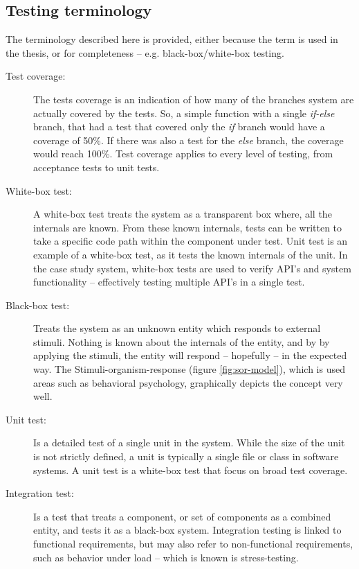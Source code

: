 \subsection{Testing terminology}
The terminology described here is provided, either because the term is used in the thesis, or for completeness -- e.g. black-box/white-box testing.
\begin{description}

  \item[Test coverage:] The tests coverage is an indication of how many of the branches system are actually covered by the tests. So, a simple function with a single \emph{if-else} branch, that had a test that covered only the \emph{if} branch would have a coverage of 50\%. If there was also a test for the \emph{else} branch, the coverage would reach 100\%. Test coverage applies to every level of testing, from acceptance tests to unit tests.

  \item[White-box test:] A white-box test treats the system as a transparent box where, all the internals are known. From these known internals, tests can be written to take a specific code path within the component under test. Unit test is an example of a white-box test, as it tests the known internals of the unit. In the case study system, white-box tests are used to verify API's and system functionality -- effectively testing multiple API's in a single test.

  \item[Black-box test:] Treats the system as an unknown entity which responds to external stimuli. Nothing is known about the internals of the entity, and by by applying the stimuli, the entity will respond -- hopefully -- in the expected way. The Stimuli-organism-response (figure \ref{fig:sor-model}), which is used areas such as behavioral psychology, graphically depicts the concept very well.

  \item[Unit test:] Is a detailed test of a single unit in the system. While the size of the unit is not strictly defined, a unit is typically a single file or class in software systems. A unit test is a white-box test that focus on broad test coverage.

  \item[Integration test:] Is a test that treats a component, or set of components as a combined entity, and tests it as a black-box system. Integration testing is linked to functional requirements, but may also refer to non-functional requirements, such as behavior under load -- which is known is stress-testing.


\end{description}
